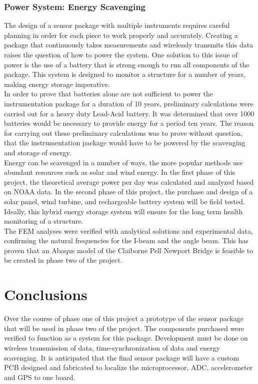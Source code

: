 \documentclass[12pt,doublespace]{report}
\begin{document}
\subsection{Power System: Energy Scavenging}
\indent The design of a sensor package with multiple instruments requires careful planning in order for each piece to work properly and accurately. Creating a package that continuously takes measurements and wirelessly transmits this data raises the question of how to power the system. One solution to this issue of power is the use of a battery that is strong enough to run all components of the package. This system is designed to monitor a structure for a number of years, making energy storage imperative.\\
\indent In order to prove that batteries alone are not sufficient to power the instrumentation package for a duration of 10 years, preliminary calculations were carried out for a heavy duty Lead-Acid battery. It was determined that over 1000 batteries would be necessary to provide energy for a period ten years. The reason for carrying out these preliminary calculations was to prove without question, that the instrumentation package would have to be powered by the scavenging and storage of energy. \\
\indent Energy can be scavenged in a number of ways, the more popular methods use abundant resources such as solar and wind energy. In the first phase of this project, the theoretical average power per day was calculated and analyzed based on NOAA data. In the second phase of this project, the purchase and design of a solar panel, wind turbine, and rechargeable battery system will be field tested. Ideally, this hybrid energy storage system will ensure for the long term health monitoring of a structure. \\
\indent The FEM analyses were verified with analytical solutions and experimental data, confirming the natural frequencies for the I-beam and the angle beam. This has proven that an Abaqus model of the Claiborne Pell Newport Bridge is feasible to be created in phase two of the project. 




\chapter{Conclusions}
\indent Over the course of phase one of this project a prototype of the sensor package that will be used in phase two of the project. The components purchased were verified to function as a system for this package. Development must be done on wireless transmission of data, time-synchronization of data and energy scavenging. It is anticipated that the final sensor package will have a custom PCB designed and fabricated to localize the microprocessor, ADC, accelerometer and GPS to one board.\\
\indent 
\end{document}
